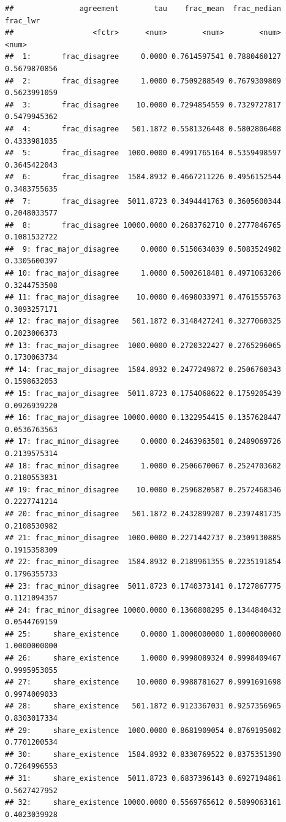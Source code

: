 \documentclass[
  11pt,
]{article}
\begin{document}
\begin{verbatim}
##               agreement        tau    frac_mean  frac_median     frac_lwr
##                  <fctr>      <num>        <num>        <num>        <num>
##  1:       frac_disagree     0.0000 0.7614597541 0.7880460127 0.5679870856
##  2:       frac_disagree     1.0000 0.7509288549 0.7679309809 0.5623991059
##  3:       frac_disagree    10.0000 0.7294854559 0.7329727817 0.5479945362
##  4:       frac_disagree   501.1872 0.5581326448 0.5802806408 0.4333981035
##  5:       frac_disagree  1000.0000 0.4991765164 0.5359498597 0.3645422043
##  6:       frac_disagree  1584.8932 0.4667211226 0.4956152544 0.3483755635
##  7:       frac_disagree  5011.8723 0.3494441763 0.3605600344 0.2048033577
##  8:       frac_disagree 10000.0000 0.2683762710 0.2777846765 0.1081532722
##  9: frac_major_disagree     0.0000 0.5150634039 0.5083524982 0.3305600397
## 10: frac_major_disagree     1.0000 0.5002618481 0.4971063206 0.3244753508
## 11: frac_major_disagree    10.0000 0.4698033971 0.4761555763 0.3093257171
## 12: frac_major_disagree   501.1872 0.3148427241 0.3277060325 0.2023006373
## 13: frac_major_disagree  1000.0000 0.2720322427 0.2765296065 0.1730063734
## 14: frac_major_disagree  1584.8932 0.2477249872 0.2506760343 0.1598632053
## 15: frac_major_disagree  5011.8723 0.1754068622 0.1759205439 0.0926939220
## 16: frac_major_disagree 10000.0000 0.1322954415 0.1357628447 0.0536763563
## 17: frac_minor_disagree     0.0000 0.2463963501 0.2489069726 0.2139575314
## 18: frac_minor_disagree     1.0000 0.2506670067 0.2524703682 0.2180553831
## 19: frac_minor_disagree    10.0000 0.2596820587 0.2572468346 0.2227741214
## 20: frac_minor_disagree   501.1872 0.2432899207 0.2397481735 0.2108530982
## 21: frac_minor_disagree  1000.0000 0.2271442737 0.2309130885 0.1915358309
## 22: frac_minor_disagree  1584.8932 0.2189961355 0.2235191854 0.1796355733
## 23: frac_minor_disagree  5011.8723 0.1740373141 0.1727867775 0.1121094357
## 24: frac_minor_disagree 10000.0000 0.1360808295 0.1344840432 0.0544769159
## 25:     share_existence     0.0000 1.0000000000 1.0000000000 1.0000000000
## 26:     share_existence     1.0000 0.9998089324 0.9998409467 0.9995953055
## 27:     share_existence    10.0000 0.9988781627 0.9991691698 0.9974009033
## 28:     share_existence   501.1872 0.9123367031 0.9257356965 0.8303017334
## 29:     share_existence  1000.0000 0.8681909054 0.8769195082 0.7701200534
## 30:     share_existence  1584.8932 0.8330769522 0.8375351390 0.7264996553
## 31:     share_existence  5011.8723 0.6837396143 0.6927194861 0.5627427952
## 32:     share_existence 10000.0000 0.5569765612 0.5899063161 0.4023039928

\end{verbatim}
\end{document}
